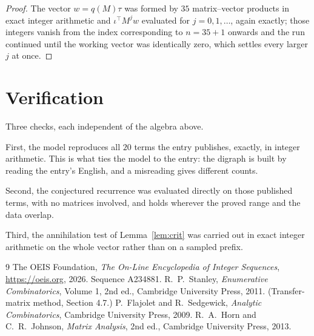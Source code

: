 \documentclass[11pt,a4paper]{article}
\theoremstyle{plain}
\theoremstyle{definition}
\begin{document}
\begin{proof}
The vector $w=q(M)\tau$ was formed by $35$ matrix--vector products in exact integer
arithmetic and $\iota^{\!\top}M^{j}w$ evaluated for $j=0,1,\dots$, again exactly; those
integers vanish from the index corresponding to $n=35+1$ onwards and the run continued
until the working vector was identically zero, which settles every larger $j$ at once.
\end{proof}

\section{Verification}

Three checks, each independent of the algebra above.

First, the model reproduces all $20$ terms the entry publishes, exactly, in integer
arithmetic. This is what ties the model to the entry: the digraph is built by reading the
entry's English, and a misreading gives different counts.

Second, the conjectured recurrence was evaluated directly on those published terms, with no
matrices involved, and holds wherever the proved range and the data overlap.

Third, the annihilation test of Lemma~\ref{lem:crit} was carried out in exact integer
arithmetic on the whole vector rather than on a sampled prefix.

\begin{thebibliography}{9}
 The OEIS Foundation, \emph{The On-Line Encyclopedia of Integer
Sequences}, \url{https://oeis.org}, 2026. Sequence A234881.
 R.~P.~Stanley, \emph{Enumerative Combinatorics}, Volume 1, 2nd ed.,
Cambridge University Press, 2011. (Transfer-matrix method, Section 4.7.)
 P.~Flajolet and R.~Sedgewick, \emph{Analytic Combinatorics}, Cambridge
University Press, 2009.
 R.~A.~Horn and C.~R.~Johnson, \emph{Matrix Analysis}, 2nd ed., Cambridge
University Press, 2013.
\end{thebibliography}
\end{document}
